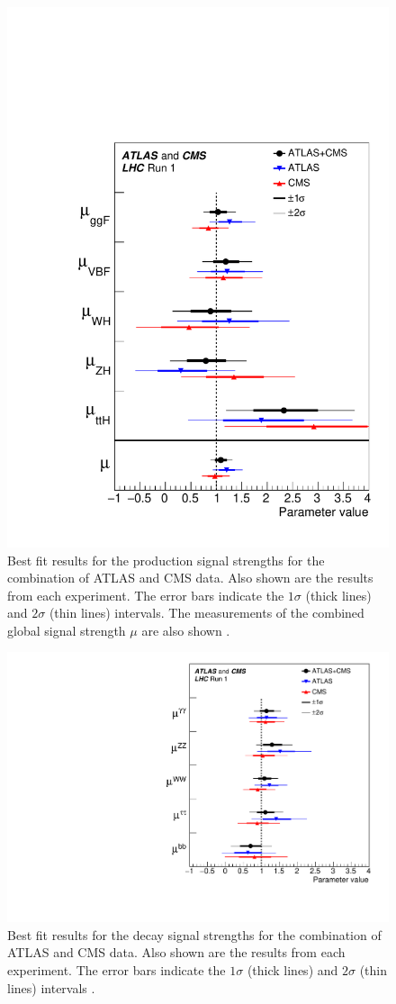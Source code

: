 \begin{figure}[!htbp]
  \begin{center}
    \includegraphics[width=0.5\linewidth]{figures/higgs/higgs_decay_measurement_1.pdf}
    \caption{Best fit results for the production signal strengths for the combination of ATLAS and CMS data. Also shown are the results from each experiment. The error bars indicate the $1\sigma$ (thick lines) and $2\sigma$ (thin lines) intervals. The measurements of the combined global signal strength $\mu$ are also shown \cite{Khachatryan:2016vau}.}
    \label{fig:higgs_decay_measurement_1}
  \end{center}
\end{figure}

\begin{figure}[!htbp]
  \begin{center}
    \includegraphics[width=0.5\linewidth]{figures/higgs/higgs_decay_measurement_2.pdf}
    \caption{ Best fit results for the decay signal strengths for the combination of ATLAS and CMS data. Also shown are the results from each experiment. The error bars indicate the $1\sigma$ (thick lines) and $2\sigma$ (thin lines) intervals \cite{Khachatryan:2016vau}.}
    \label{fig:higgs_decay_measurement_2}
  \end{center}
\end{figure}
